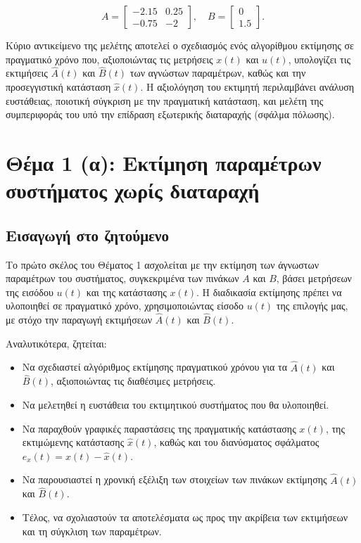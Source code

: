 \documentclass[a4paper,12pt]{report}
\begin{document}
\[
A = \begin{bmatrix} -2.15 & 0.25 \\ -0.75 & -2 \end{bmatrix}, \quad
B = \begin{bmatrix} 0 \\ 1.5 \end{bmatrix}.
\]

\hspace{-0.6cm}Κύριο αντικείμενο της μελέτης αποτελεί ο σχεδιασμός ενός αλγορίθμου εκτίμησης σε πραγματικό χρόνο που, αξιοποιώντας τις μετρήσεις $x(t)$ και $u(t)$, υπολογίζει τις εκτιμήσεις $\hat{A}(t)$ και $\hat{B}(t)$ των αγνώστων παραμέτρων, καθώς και την προσεγγιστική κατάσταση $\hat{x}(t)$. Η αξιολόγηση του εκτιμητή περιλαμβάνει ανάλυση ευστάθειας, ποιοτική σύγκριση με την πραγματική κατάσταση, και μελέτη της συμπεριφοράς του υπό την επίδραση εξωτερικής διαταραχής (σφάλμα πόλωσης).

\vspace{0.3cm}

\section{Θέμα 1 (α): Εκτίμηση παραμέτρων συστήματος χωρίς διαταραχή}

\subsection{Εισαγωγή στο ζητούμενο}

Το πρώτο σκέλος του Θέματος 1 ασχολείται με την εκτίμηση των άγνωστων παραμέτρων του συστήματος, συγκεκριμένα των πινάκων $A$ και $B$, βάσει μετρήσεων της εισόδου $u(t)$ και της κατάστασης $x(t)$. Η διαδικασία εκτίμησης πρέπει να υλοποιηθεί σε πραγματικό χρόνο, χρησιμοποιώντας είσοδο $u(t)$ της επιλογής μας, με στόχο την παραγωγή εκτιμήσεων $\hat{A}(t)$ και $\hat{B}(t)$.

Αναλυτικότερα, ζητείται:
\begin{itemize}
    \item Να σχεδιαστεί αλγόριθμος εκτίμησης πραγματικού χρόνου για τα $\hat{A}(t)$ και $\hat{B}(t)$, αξιοποιώντας τις διαθέσιμες μετρήσεις.
    \item Να μελετηθεί η ευστάθεια του εκτιμητικού συστήματος που θα υλοποιηθεί.
    \item Να παραχθούν γραφικές παραστάσεις της πραγματικής κατάστασης $x(t)$, της εκτιμώμενης κατάστασης $\hat{x}(t)$, καθώς και του διανύσματος σφάλματος $e_x(t) = x(t) - \hat{x}(t)$.
    \item Να παρουσιαστεί η χρονική εξέλιξη των στοιχείων των πινάκων εκτίμησης $\hat{A}(t)$ και $\hat{B}(t)$.
    \item Τέλος, να σχολιαστούν τα αποτελέσματα ως προς την ακρίβεια των εκτιμήσεων και τη σύγκλιση των παραμέτρων.
\end{itemize}
\end{document}
